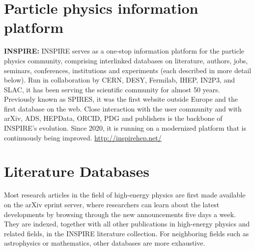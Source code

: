 \section{Particle physics information
platform}\label{databases:sec:platforms}

  \textbf{INSPIRE:} INSPIRE serves as a one-stop information platform
  for the particle physics community, comprising interlinked databases
  on literature, authors, jobs, seminars, conferences, institutions and
  experiments (each described in more detail below). Run in collaboration by CERN, DESY,
  Fermilab, IHEP, IN2P3, and SLAC, it has been serving the scientific
  community for almost 50 years. Previously known as SPIRES, it was the
  first website outside Europe and the first database on the web. Close
  interaction with the user community and with arXiv, ADS, HEPData,
  ORCID, PDG and publishers is the backbone of INSPIRE's evolution.
  Since 2020, it is running on a modernized platform that is continuously being improved.
  \url{http://inspirehep.net/}

\section{Literature Databases}\label{databases:sec:literature}


Most research articles in the field of high-energy physics are first made
available on the arXiv eprint server, where researchers can learn about the
latest developments by browsing through the new announcements 
five days a week. They are indexed, together with all other publications in
high-energy physics and related fields, in the INSPIRE literature collection.
For neighboring fields such as astrophysics or mathematics, other databases are
more exhaustive.

